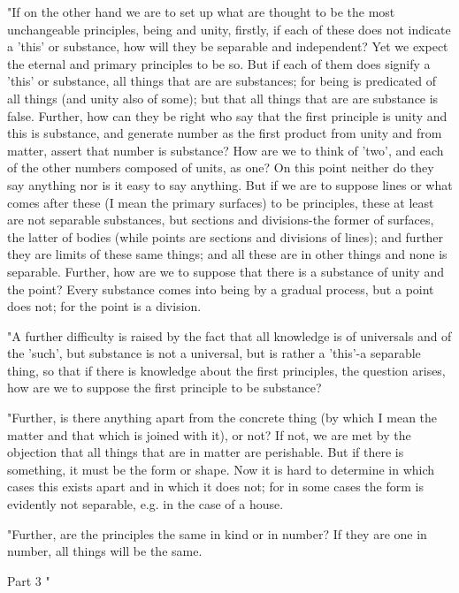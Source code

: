 "If on the other hand we are to set up what are thought to be the
most unchangeable principles, being and unity, firstly, if each of
these does not indicate a 'this' or substance, how will they be separable
and independent? Yet we expect the eternal and primary principles
to be so. But if each of them does signify a 'this' or substance,
all things that are are substances; for being is predicated of all
things (and unity also of some); but that all things that are are
substance is false. Further, how can they be right who say that the
first principle is unity and this is substance, and generate number
as the first product from unity and from matter, assert that number
is substance? How are we to think of 'two', and each of the other
numbers composed of units, as one? On this point neither do they say
anything nor is it easy to say anything. But if we are to suppose
lines or what comes after these (I mean the primary surfaces) to be
principles, these at least are not separable substances, but sections
and divisions-the former of surfaces, the latter of bodies (while
points are sections and divisions of lines); and further they are
limits of these same things; and all these are in other things and
none is separable. Further, how are we to suppose that there is a
substance of unity and the point? Every substance comes into being
by a gradual process, but a point does not; for the point is a division.

"A further difficulty is raised by the fact that all knowledge is
of universals and of the 'such', but substance is not a universal,
but is rather a 'this'-a separable thing, so that if there is knowledge
about the first principles, the question arises, how are we to suppose
the first principle to be substance? 

"Further, is there anything apart from the concrete thing (by which
I mean the matter and that which is joined with it), or not? If not,
we are met by the objection that all things that are in matter are
perishable. But if there is something, it must be the form or shape.
Now it is hard to determine in which cases this exists apart and in
which it does not; for in some cases the form is evidently not separable,
e.g. in the case of a house. 

"Further, are the principles the same in kind or in number? If they
are one in number, all things will be the same. 

Part 3 "

